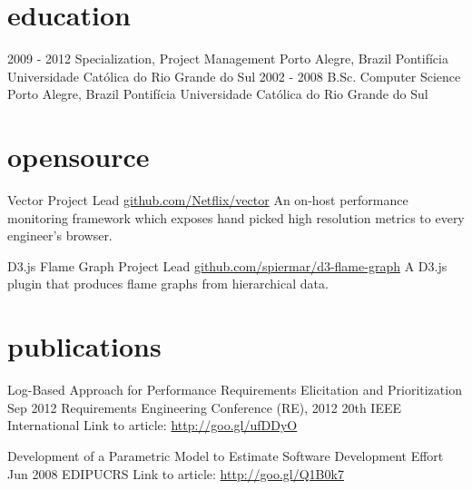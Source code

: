 \documentclass[]{mspier-cv}
\begin{document}
\section{education}

\begin{entrylist}
  \entry
    {2009 - 2012}
    {Specialization, Project Management}
    {Porto Alegre, Brazil}
    {Pontifícia Universidade Católica do Rio Grande do Sul}
  \entry
    {2002 - 2008}
    {B.Sc. Computer Science}
    {Porto Alegre, Brazil}
    {Pontifícia Universidade Católica do Rio Grande do Sul}
\end{entrylist}

\section{opensource}

\opensourceitem
  {Vector}
  {Project Lead}
  {\href{https://github.com/Netflix/vector}{github.com/Netflix/vector}}
  {An on-host performance monitoring framework which exposes hand picked high resolution metrics to every engineer’s browser.}

\opensourceitem
  {D3.js Flame Graph}
  {Project Lead}
  {\href{https://github.com/spiermar/d3-flame-graph}{github.com/spiermar/d3-flame-graph}}
  {A D3.js plugin that produces flame graphs from hierarchical data.}

\section{publications}

\publicationitem
  {Log-Based Approach for Performance Requirements Elicitation and Prioritization}
  {Sep 2012}
  {Requirements Engineering Conference (RE), 2012 20th IEEE International}
  {Link to article: \url{http://goo.gl/ufDDyO}}

\publicationitem
  {Development of a Parametric Model to Estimate Software Development Effort}
  {Jun 2008}
  {EDIPUCRS}
  {Link to article: \url{http://goo.gl/Q1B0k7}}

%
\end{document}
